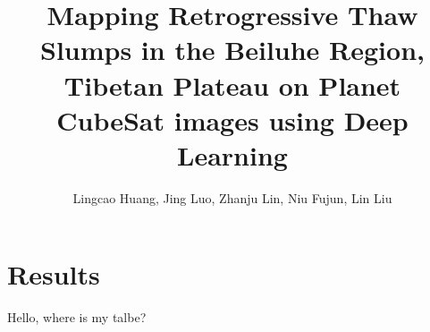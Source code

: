 \documentclass[preprint,12pt,authoryear]{elsarticle}
\begin{document}
\begin{frontmatter}



\title{Mapping Retrogressive Thaw Slumps in the Beiluhe Region, Tibetan Plateau on Planet CubeSat images using Deep Learning}


\author{Lingcao Huang, Jing Luo, Zhanju Lin, Niu Fujun, Lin Liu}

\address{hellloworld}

\begin{abstract}

\end{abstract}

\begin{keyword}



\end{keyword}

\end{frontmatter}


\section{Results}
\label{sec_res}

Hello, where is my talbe?\citep{zhu_deep_2017}
\end{document}
